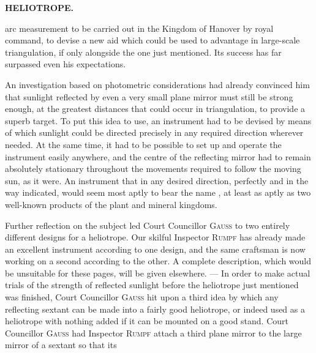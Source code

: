 \par\clearpage
\noindent{}\hfill{\small\textbf{HELIOTROPE.}}\hfill\null\par\medskip
\noindent arc measurement to be carried out in the Kingdom of Hanover by royal command, to devise a new aid which could be used to advantage in large-scale triangulation, if only alongside the one just mentioned. Its success has far surpassed even his expectations.

\par\noindent\hspace*{\parindent}An investigation based on photometric considerations had already convinced him that sunlight reflected by even a very small plane mirror must still be strong enough, at the greatest distances that could occur in triangulation, to provide a superb target. To put this idea to use, an instrument had to be devised by means of which sunlight could be directed precisely in any required direction wherever needed. At the same time, it had to be possible to set up and operate the instrument easily anywhere, and the centre of the reflecting mirror had to remain absolutely stationary throughout the movements required to follow the moving sun, as it were. An instrument that  in any desired direction, perfectly and in the way indicated, would seem most aptly to bear the name , at least as aptly as two well-known products of the plant and mineral kingdoms.

\par\noindent\hspace*{\parindent}Further reflection on the subject led Court Councillor \textsc{Gauss} to two entirely different designs for a heliotrope. Our skilful Inspector \textsc{Rumpf} has already made an excellent instrument according to one design, and the same craftsman is now working on a second according to the other. A complete description, which would be unsuitable for these pages, will be given elsewhere. --- In order to make actual trials of the strength of reflected sunlight before the heliotrope just mentioned was finished, Court Councillor \textsc{Gauss} hit upon a third idea by which any reflecting sextant can be made into a fairly good heliotrope, or indeed used as a heliotrope with nothing added if it can be mounted on a good stand. Court Councillor \textsc{Gauss} had Inspector \textsc{Rumpf} attach a third plane mirror to the large mirror of a sextant so that its

